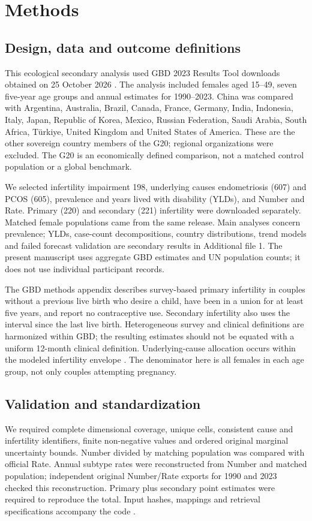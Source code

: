 \documentclass[11pt,a4paper]{article}
\begin{document}
\section{Methods}
\subsection{Design, data and outcome definitions}
This ecological secondary analysis used GBD 2023 Results Tool downloads obtained on 25 October 2026 \cite{results}. The analysis included females aged 15--49, seven five-year age groups and annual estimates for 1990--2023. China was compared with Argentina, Australia, Brazil, Canada, France, Germany, India, Indonesia, Italy, Japan, Republic of Korea, Mexico, Russian Federation, Saudi Arabia, South Africa, T\"urkiye, United Kingdom and United States of America. These are the other sovereign country members of the G20; regional organizations were excluded. The G20 is an economically defined comparison, not a matched control population or a global benchmark.

We selected infertility impairment 198, underlying causes endometriosis (607) and PCOS (605), prevalence and years lived with disability (YLDs), and Number and Rate. Primary (220) and secondary (221) infertility were downloaded separately. Matched female populations came from the same release. Main analyses concern prevalence; YLDs, case-count decompositions, country distributions, trend models and failed forecast validation are secondary results in Additional file 1. The present manuscript uses aggregate GBD estimates and UN population counts; it does not use individual participant records.

The GBD methods appendix describes survey-based primary infertility in couples without a previous live birth who desire a child, have been in a union for at least five years, and report no contraceptive use. Secondary infertility also uses the interval since the last live birth. Heterogeneous survey and clinical definitions are harmonized within GBD; the resulting estimates should not be equated with a uniform 12-month clinical definition. Underlying-cause allocation occurs within the modeled infertility envelope \cite{gbd}. The denominator here is all females in each age group, not only couples attempting pregnancy.

\subsection{Validation and standardization}
We required complete dimensional coverage, unique cells, consistent cause and infertility identifiers, finite non-negative values and ordered original marginal uncertainty bounds. Number divided by matching population was compared with official Rate. Annual subtype rates were reconstructed from Number and matched population; independent original Number/Rate exports for 1990 and 2023 checked this reconstruction. Primary plus secondary point estimates were required to reproduce the total. Input hashes, mappings and retrieval specifications accompany the code \cite{repository}.
\end{document}
